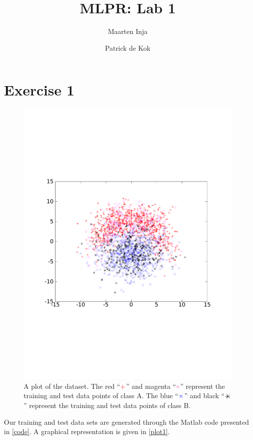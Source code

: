 \documentclass[a4paper,11pt]{article}
\author{Maarten Inja \and Patrick de Kok}
\title{MLPR: Lab 1}
\newcommand{\convolution}{\ensuremath{+\negmedspace\negmedspace\negmedspace\times}}
\begin{document}
\maketitle

\section*{Exercise 1}
\begin{figure}[h]
  \caption{A plot of the dataset.  The red ``$\color{red}+$'' and magenta ``$\color{magenta}\circ$'' represent the training and test data points of class A.  The blue ``$\color{blue}\times$'' and black ``$\convolution$'' represent the training and test data points of class B.}
  \label{plot1}
  \begin{center}
    \includegraphics[width=0.6\paperwidth]{plot1}
  \end{center}
\end{figure}

Our training and test data sets are generated through the Matlab code presented in \autoref{code}.  A graphical representation is given in \autoref{plot1}.
\end{document}
